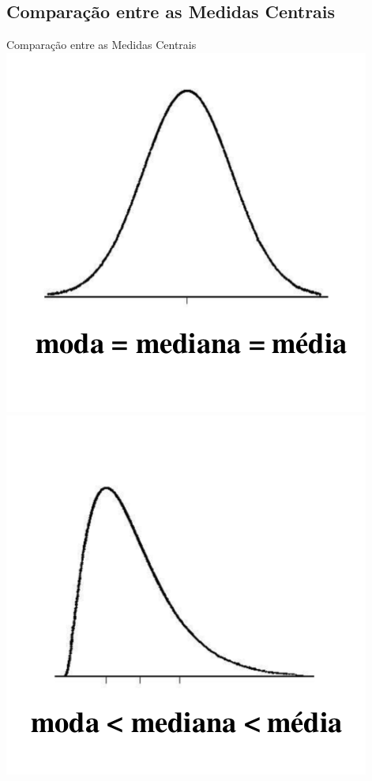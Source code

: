 \documentclass{beamer}
\begin{document}
\subsection[Comparação]{Comparação entre as Medidas Centrais}

\begin{frame}{Comparação entre as Medidas Centrais}
    \includegraphics[height=0.4\textheight]{Desc_II/medidas1}
    \includegraphics[height=0.4\textheight]{Desc_II/medidas2}

\end{frame}
\end{document}

